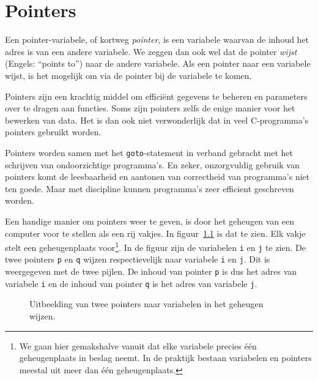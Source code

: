 \chapter{Pointers}
\label{cha:pointers}
\thispagestyle{empty}

Een pointer-variabele, of kortweg \textsl{pointer}, is een variabele waarvan de inhoud het adres is van een andere variabele. We zeggen dan ook wel dat de pointer \textsl{wijst} (Engels: ``points to'') naar de andere variabele. Als een pointer naar een variabele wijst, is het mogelijk om via de pointer bij de variabele te komen.

Pointers zijn een krachtig middel om efficiënt gegevens te beheren en parameters over te dragen aan functies. Soms zijn pointers zelfs de enige manier voor het bewerken van data. Het is dan ook niet verwonderlijk dat in veel C-programma's pointers gebruikt worden. 

Pointers worden samen met het \texttt{goto}-statement in verband gebracht met het schrijven van ondoorzichtige programma's. En zeker, onzorgvuldig gebruik van pointers komt de leesbaarheid en aantonen van correctheid van programma's niet ten goede. Maar met discipline kunnen programma's zeer efficient geschreven worden.

Een handige manier om pointers weer te geven, is door het geheugen van een computer voor te stellen als een rij vakjes. In figuur~\ref{fig:poiinmem} is dat te zien. Elk vakje stelt een geheugenplaats voor\footnote{We gaan hier gemakshalve vanuit dat elke variabele precies één geheugenplaats in beslag neemt. In de praktijk bestaan variabelen en pointers meestal uit meer dan één geheugenplaats.}. In de figuur zijn de variabelen \texttt{i} en \texttt{j} te zien. De twee pointers \texttt{p} en \texttt{q} wijzen respectievelijk naar variabele \texttt{i} en \texttt{j}. Dit is weergegeven met de twee pijlen. De inhoud van pointer \texttt{p} is dus het adres van variabele \texttt{i} en de inhoud van pointer \texttt{q} is het adres van variabele \texttt{j}.

\vspace*{-0.5\baselineskip}
\begin{figure}[!ht]
\centering
{}
\caption{Uitbeelding van twee pointers naar variabelen in het geheugen wijzen.}
\label{fig:poiinmem}
\end{figure}

